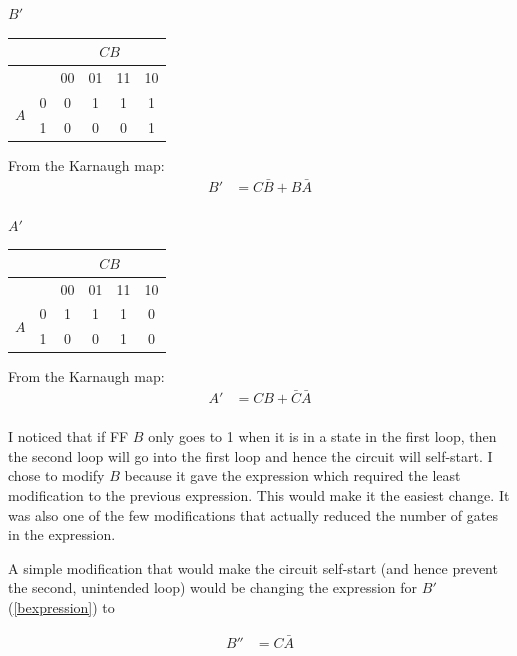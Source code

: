 \documentclass[10pt,\jkfside,a4paper]{article}
\begin{document}
\begin{enumerate}
\begin{center}
{\large $B'$}

\begin{tabular}{|c|c|c|c|c|c|} 
\hline
& & \multicolumn{4}{c|}{$CB$} \\
\hline
& & 00 & 01 & 11 & 10 \\ 
\hline
\multirow{2}{2em}{$A$} 
& 0 & 0 & 1 & 1 & 1 \\
& 1 & 0 & 0 & 0 & 1 \\
\hline
\end{tabular}

From the Karnaugh map:
\begin{equation}\label{bexpression}
\begin{split}
B' &= C\bar B + B\bar A\\
\end{split}
\end{equation}

{\large $A'$}

\begin{tabular}{|c|c|c|c|c|c|} 
\hline
& & \multicolumn{4}{c|}{$CB$} \\
\hline
& & 00 & 01 & 11 & 10 \\ 
\hline
\multirow{2}{2em}{$A$} 
& 0 & 1 & 1 & 1 & 0 \\
& 1 & 0 & 0 & 1 & 0 \\
\hline
\end{tabular}

From the Karnaugh map:
\begin{equation}
\begin{split}
A' &= CB + \bar C\bar A\\
\end{split}
\end{equation}

\end{center}

I noticed that if FF $B$ only goes to 1 when it is in a state in the first loop, then 
the second loop will go into the first loop and hence the circuit will self-start.
I chose to modify $B$ because it gave the expression which required the least 
modification to the previous expression. This would make it the easiest change.
It was also one of the few modifications that actually reduced the number of gates in 
the expression.

A simple modification that would make the circuit self-start (and hence prevent the second, 
unintended loop) would be changing the expression for $B'$ (\ref{bexpression}) to 

\begin{equation}
\begin{split}
B'' &= C\bar A\\
\end{split}
\end{equation}


\end{enumerate}
\end{document}

